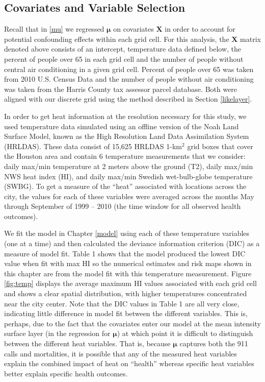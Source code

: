 \documentclass[final]{statsoc}
\begin{document}
\subsection{Covariates and Variable Selection}\label{sec:temp_data}
Recall that in \eqref{mu} we regressed $\boldsymbol{\mu}$ on covariates $\mathbf{X}$ in order to account for potential confounding effects within each grid cell.   For this analysis, the $\mathbf{X}$ matrix denoted above consists of an intercept, temperature data defined below, the percent of people over 65 in each grid cell and the number of people without central air conditioning in a given grid cell. Percent of people over 65 was taken from 2010 U.S. Census Data and the number of people without air conditioning was taken from the Harris County tax assessor parcel database. Both were aligned with our discrete grid using the method described in Section \ref{likelayer}. 

In order to get heat information at the resolution necessary for this
study, we used temperature data simulated using an offline version of the 
Noah Land Surface Model, known as the High Resolution Land Data Assimilation 
System (HRLDAS).
These data consist of 15,625 HRLDAS 1-km$^2$ grid boxes that cover the Houston
area and contain 6 temperature measurements that we consider: daily max/min 
temperature at 2 meters above the ground (T2), daily max/min NWS heat index (HI), and
daily max/min Swedish wet-bulb-globe temperature (SWBG). To get a measure of the 
``heat'' associated with locations across the city, the values for each of 
these variables were averaged across the months May through September of 
1999 -- 2010 (the time window for all observed health outcomes). 

We fit the model in Chapter \ref{model} using each of these temperature variables (one at a time) and then calculated the deviance information criterion (DIC) \citep{Spiegelhalter2002} as a measure of model fit. 
Table 1%
shows that the model produced the lowest DIC value when fit with max HI so the numerical estimates and risk maps shown in this chapter are from the model fit with this temperature measurement. Figure \ref{fig:temp} displays the average maximum HI values associated with each grid cell and shows a clear spatial distribution, with higher temperatures concentrated near the city center. Note that the DIC values in Table 1
are all very close, indicating little difference in model fit between the different variables.  This is, perhaps, due to the fact that the covariates enter our model at the mean intensity surface layer (in the regression for $\boldsymbol{\mu}$) at which point it is difficult to distinguish between the different heat variables. That is, because $\boldsymbol{\mu}$ captures both the 911 calls and mortalities, it is possible that any of the measured heat variables explain the combined impact of heat on ``health'' whereas specific heat variables better explain specific health outcomes.
\end{document}
